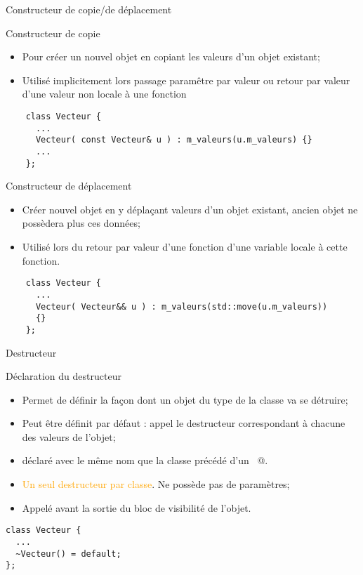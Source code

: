 \documentclass[compress,10pt,aspectratio=169]{beamer}
\begin{document}
    \begin{frame}[fragile]{Constructeur de copie/de déplacement}
    \scriptsize
    \vspace*{-3mm}
    \begin{block}{\small Constructeur de copie}
    \begin{itemize}
      \item Pour créer un nouvel objet en copiant les valeurs d'un objet existant;
      \item Utilisé implicitement lors passage paramêtre par valeur ou retour
            par valeur d'une valeur non locale à une fonction
    \end{itemize}
    
    \begin{verbatim}
    class Vecteur {
      ...
      Vecteur( const Vecteur& u ) : m_valeurs(u.m_valeurs) {}
      ...
    };
    \end{verbatim}
    \end{block}
    \vspace*{-3mm}
    \begin{block}{\small Constructeur de déplacement}
    \begin{itemize}
      \item Créer nouvel objet en y déplaçant valeurs d'un objet existant,
            ancien objet ne possèdera plus ces données;
      \item Utilisé lors du retour par valeur d'une fonction d'une variable locale à cette fonction.
    \end{itemize}
    \begin{verbatim}
    class Vecteur {
      ...
      Vecteur( Vecteur&& u ) : m_valeurs(std::move(u.m_valeurs))
      {}
    };
    \end{verbatim}
    \end{block}
    \end{frame}

\begin{frame}[fragile]{Destructeur}
  \scriptsize
  \begin{block}{\small Déclaration du destructeur}
  \begin{itemize}
    \item Permet de définir la façon dont un objet du type de la classe va se détruire;
    \item Peut être définit par défaut : appel le destructeur correspondant à chacune des valeurs de l'objet;
    \item déclaré avec le même nom que la classe précédé d'un \verb@~@.
    \item \textcolor{orange}{Un seul destructeur par classe}. Ne possède pas de paramètres;
    \item Appelé avant la sortie du bloc de visibilité de l'objet.
  \end{itemize}
  \end{block}
  \begin{verbatim}
class Vecteur { 
  ...
  ~Vecteur() = default;
};
\end{verbatim}
\end{frame}
      
\end{document}

